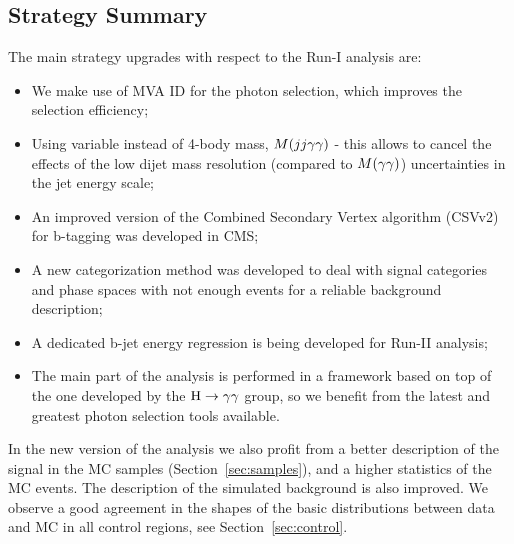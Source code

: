 
\subsection{Strategy Summary}

The main strategy upgrades with respect to the Run-I analysis are:
\begin{itemize}

\item We make use of MVA ID for the photon selection, which improves the selection efficiency;

\item Using \Mtilde variable instead of 4-body mass, $M(jj\gamma\gamma)$ - this allows to cancel the effects of the low dijet mass resolution (compared to $M(\gamma\gamma)$) uncertainties in the jet energy scale;

\item An improved version of the Combined Secondary Vertex algorithm (CSVv2) for b-tagging was developed in CMS;

\item A new categorization method was developed to deal with signal categories and phase spaces with not enough events for a reliable background description;

\item A dedicated b-jet energy regression is being developed for Run-II analysis; 

\item The main part of the analysis is performed in a framework based on top of the one developed by the $\mathrm{H}\to\gamma\gamma$ group, so we benefit from the latest and greatest photon selection tools available.

\end{itemize}

In the new version of the analysis we also profit from a better description of the signal in the MC
samples (Section~\ref{sec:samples}), and a higher statistics of the MC events. The
description of the simulated background is also improved. We observe a good agreement in
the shapes of the basic distributions between data and MC in all control regions, see
Section~\ref{sec:control}.

